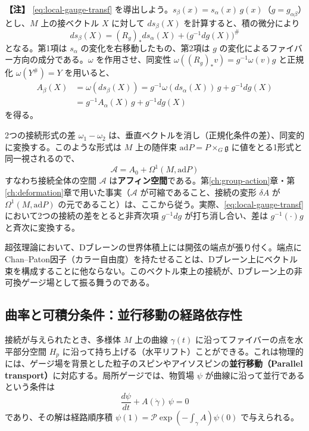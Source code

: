\documentclass[uplatex, dvipdfmx, book]{jsbook}
\let\origsubsection\subsection
\let\origsubsubsection\subsubsection
\renewcommand{\section}{\origsubsection}
\renewcommand{\subsection}{\origsubsubsection}
\renewcommand{\subsubsection}{\paragraph}
\newenvironment{note}{\vspace{1ex}\par\footnotesize\noindent\textbf{【注】}}{\par\vspace{1ex}}
\begin{document}
\begin{note}
\eqref{eq:local-gauge-transf} を導出しよう。$s_\beta(x) = s_\alpha(x)\, g(x)$（$g = g_{\alpha\beta}$）とし、$M$ 上の接ベクトル $X$ に対して $ds_\beta(X)$ を計算すると、積の微分により
\begin{equation*}
    ds_\beta(X) = (R_{g})_* ds_\alpha(X) + \bigl( g^{-1} dg(X) \bigr)^\#
\end{equation*}
となる。第1項は $s_\alpha$ の変化を右移動したもの、第2項は $g$ の変化によるファイバー方向の成分である。$\omega$ を作用させ、同変性 $\omega((R_g)_* v) = g^{-1}\omega(v) g$ と正規化 $\omega(Y^\#) = Y$ を用いると、
\begin{align*}
    A_\beta(X) &= \omega(ds_\beta(X)) = g^{-1} \omega(ds_\alpha(X))\, g + g^{-1} dg(X) \\
    &= g^{-1} A_\alpha(X)\, g + g^{-1} dg(X)
\end{align*}
を得る。
\end{note}

2つの接続形式の差 $\omega_1 - \omega_2$ は、垂直ベクトルを消し（正規化条件の差）、同変的に変換する。このような形式は $M$ 上の随伴束 $\mathrm{ad}P = P \times_G \mathfrak{g}$ に値をとる1形式と同一視されるので、
\begin{equation}
    \mathcal{A} = A_0 + \Omega^1(M, \mathrm{ad}P)
\end{equation}
すなわち接続全体の空間 $\mathcal{A}$ は\textbf{アフィン空間}である。第\ref{ch:group-action}章・第\ref{ch:deformation}章で用いた事実（$\mathcal{A}$ が可縮であること、接続の変形 $\delta A$ が $\Omega^1(M, \mathrm{ad}P)$ の元であること）は、ここから従う。実際、\eqref{eq:local-gauge-transf} において2つの接続の差をとると非斉次項 $g^{-1}dg$ が打ち消し合い、差は $g^{-1}(\cdot)g$ と斉次に変換する。

超弦理論において、Dブレーンの世界体積上には開弦の端点が張り付く。端点にChan--Paton因子（カラー自由度）を持たせることは、Dブレーン上にベクトル束を構成することに他ならない。このベクトル束上の接続が、Dブレーン上の非可換ゲージ場として振る舞うのである。

\section{曲率と可積分条件：並行移動の経路依存性}

接続が与えられたとき、多様体 $M$ 上の曲線 $\gamma(t)$ に沿ってファイバーの点を水平部分空間 $H_p$ に沿って持ち上げる（水平リフト）ことができる。これは物理的には、ゲージ場を背景とした粒子のスピンやアイソスピンの\textbf{並行移動（Parallel transport）}に対応する。局所ゲージでは、物質場 $\psi$ が曲線に沿って並行であるという条件は
\begin{equation}
    \frac{d\psi}{dt} + A(\dot\gamma)\, \psi = 0
\end{equation}
であり、その解は経路順序積 $\psi(1) = \mathcal{P}\exp\left( -\int_\gamma A \right) \psi(0)$ で与えられる。
\end{document}
